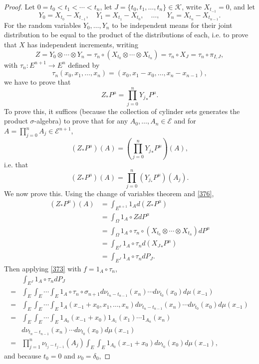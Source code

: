 \documentclass{article}
\theoremstyle{definition}
\begin{document}
\begin{proof}
Let $0=t_0<t_1<\cdots<t_n$, let $J=\{t_0,t_1,\ldots,t_n\} \in \mathscr{K}$, write $X_{t_{-1}}=0$, and let
\[
Y_0=X_{t_0}-X_{t_{-1}}, \quad Y_1=X_{t_1}-X_{t_0}, \quad \ldots, \quad Y_n=X_{t_n}-X_{t_{n-1}}.
\]
For the random variables $Y_0,\ldots,Y_n$ to be independent means for their joint distribution to be equal to the product of the distributions of each, i.e.
to prove that $X$ has independent increments, writing
\[
Z = Y_0 \otimes \cdots \otimes Y_n = \tau_n \circ (X_{t_0} \otimes \cdots \otimes X_{t_n}) = \tau_n \circ X_J = \tau_n
\circ \pi_{I,J},
\]
with $\tau_n:E^{n+1} \to E^n$ defined by
\[
\tau_n(x_0,x_1,\ldots,x_n)=(x_0,x_1-x_0,\ldots,x_n-x_{n-1}),
\]
we have to prove that
\[
Z_* P^\mu = \prod_{j=0}^n {Y_j}_* P^\mu.
\]
To prove this, it suffices (because the collection of cylinder sets generates the product
$\sigma$-algebra) to prove that for  any
$A_0,\ldots,A_n \in \mathscr{E}$ and for $A = \prod_{j=0}^n A_j \in \mathscr{E}^{n+1}$,
\[
(Z_* P^\mu)(A) = \left( \prod_{j=0}^n {Y_j}_* P^\mu\right)(A),
\]
i.e. that 
\[
(Z_* P^\mu)(A) = \prod_{j=0}^n (Y_{j_*}P^\mu)(A_j).
\]
We now prove this. Using the change of variables theorem and \eqref{376},
\begin{align*}
(Z_* P^\mu)(A)&=\int_{E^{n+1}} 1_A d(Z_*P^\mu)\\
&=\int_\Omega 1_A \circ Z dP^\mu\\
&=\int_\Omega 1_A \circ \tau_n \circ (X_{t_0} \otimes \cdots \otimes X_{t_n}) dP^\mu\\
&=\int_{E^J} 1_A \circ \tau_n d({X_J}_*P^\mu)\\
&=\int_{E^J} 1_A \circ \tau_n dP_J.
\end{align*}
Then applying  \eqref{373} with $f=1_A \circ \tau_n$,
\[
\begin{split}
&\int_{E^J} 1_A \circ \tau_n dP_J\\
=&\int_E \int_E \cdots \int_E 1_A \circ \tau_n \circ \sigma_{n+1} 
d\nu_{t_n-t_{n-1}}(x_n) \cdots d\nu_{t_0}(x_0) d\mu(x_{-1})\\
=&\int_E \int_E \cdots \int_E 1_A(x_{-1}+x_0,x_1,\ldots,x_n) d\nu_{t_n-t_{n-1}}(x_n) \cdots d\nu_{t_0}(x_0) d\mu(x_{-1})\\
=&\int_E \int_E \cdots \int_E 1_{A_0}(x_{-1}+x_0) 1_{A_1}(x_1) \cdots 1_{A_n}(x_n)\\
&d\nu_{t_n-t_{n-1}}(x_n) \cdots d\nu_{t_0}(x_0) d\mu(x_{-1})\\
=&\prod_{j=1}^n \nu_{t_j-t_{j-1}}(A_j) \int_E \int_E 1_{A_0}(x_{-1}+x_0) d\nu_{t_0}(x_0) d\mu(x_{-1}),
\end{split}
\]
and because $t_0=0$ and $\nu_0=\delta_0$,

\end{proof}
\end{document}
